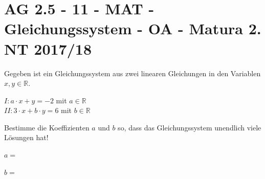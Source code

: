 \section{AG 2.5 - 11 - MAT - Gleichungssystem - OA - Matura 2. NT 2017/18}

\begin{beispiel}[AG 2.5]{1}
Gegeben ist ein Gleichungssystem aus zwei linearen Gleichungen in den Variablen $x,y\in\mathbb{R}$.

$I:a\cdot x+y=-2$ mit $a\in\mathbb{R}$\\
$II:3\cdot x+b\cdot y=6$ mit $b\in\mathbb{R}$

Bestimme die Koeffizienten $a$ und $b$ so, dass das Gleichungssystem unendlich viele Lösungen hat!\leer

$a=$\,\leer

$b=$\,
\end{beispiel}